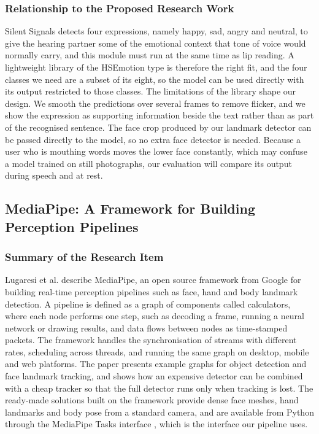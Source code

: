 \documentclass{FastFyp}
\begin{document}
\subsubsection*{Relationship to the Proposed Research Work}
Silent Signals detects four expressions, namely happy, sad, angry and neutral, to give the hearing partner some of the emotional context that tone of voice would normally carry, and this module must run at the same time as lip reading. A lightweight library of the HSEmotion type is therefore the right fit, and the four classes we need are a subset of its eight, so the model can be used directly with its output restricted to those classes. The limitations of the library shape our design. We smooth the predictions over several frames to remove flicker, and we show the expression as supporting information beside the text rather than as part of the recognised sentence. The face crop produced by our landmark detector can be passed directly to the model, so no extra face detector is needed. Because a user who is mouthing words moves the lower face constantly, which may confuse a model trained on still photographs, our evaluation will compare its output during speech and at rest.

\subsection{MediaPipe: A Framework for Building Perception Pipelines}
\subsubsection*{Summary of the Research Item}
Lugaresi et al. \cite{lugaresi2019mediapipe} describe MediaPipe, an open source framework from Google for building real-time perception pipelines such as face, hand and body landmark detection. A pipeline is defined as a graph of components called calculators, where each node performs one step, such as decoding a frame, running a neural network or drawing results, and data flows between nodes as time-stamped packets. The framework handles the synchronisation of streams with different rates, scheduling across threads, and running the same graph on desktop, mobile and web platforms. The paper presents example graphs for object detection and face landmark tracking, and shows how an expensive detector can be combined with a cheap tracker so that the full detector runs only when tracking is lost. The ready-made solutions built on the framework provide dense face meshes, hand landmarks and body pose from a standard camera, and are available from Python through the MediaPipe Tasks interface \cite{googlemediapipe2026}, which is the interface our pipeline uses.
\end{document}
